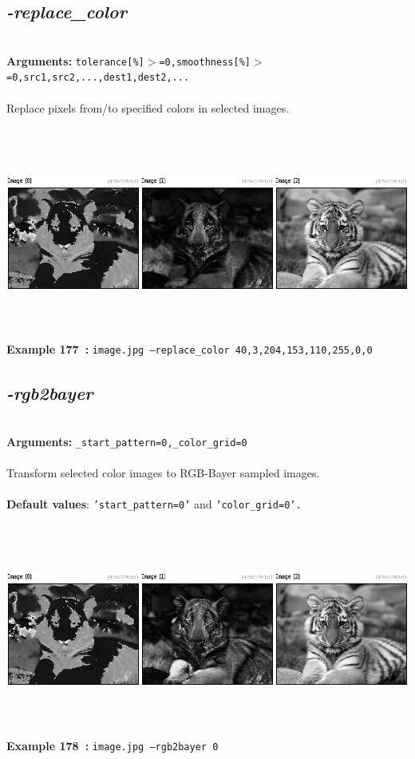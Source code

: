 \documentclass[a4paper,11pt,twoside]{book}
\begin{document}
\subsection{\emph{-replace\_color} }\vspace*{-0.5em}
~\\\textbf{Arguments: } 
{\small \texttt{tolerance[\%]$>$=0,smoothness[\%]$>$=0,src1,src2,...,dest1,dest2,...}}\\~\\
Replace pixels from/to specified colors in selected images.
\begin{center}\includegraphics[keepaspectratio=true,height=7cm,width=\textwidth]{img/gmic_def177.jpg}\\
{\footnotesize \textbf{Example 177~:} \texttt{image.jpg --replace\_color 40,3,204,153,110,255,0,0}}
\end{center}

\subsection{\emph{-rgb2bayer} }\vspace*{-0.5em}
~\\\textbf{Arguments: } 
{\small \texttt{\_start\_pattern=0,\_color\_grid=0}}\\~\\
Transform selected color images to RGB-Bayer sampled images.
~\\~\\\textbf{Default values}: {\small \texttt{'start\_pattern=0'} and \texttt{'color\_grid=0'.}}
\begin{center}\includegraphics[keepaspectratio=true,height=7cm,width=\textwidth]{img/gmic_def178.jpg}\\
{\footnotesize \textbf{Example 178~:} \texttt{image.jpg --rgb2bayer 0}}
\end{center}
\end{document}
